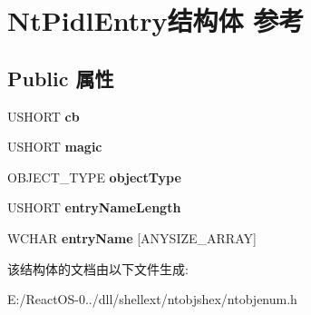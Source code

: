 \hypertarget{struct_nt_pidl_entry}{}\section{Nt\+Pidl\+Entry结构体 参考}
\label{struct_nt_pidl_entry}
\subsection*{Public 属性}
\begin{DoxyCompactItemize}
\item 
\mbox{\label{struct_nt_pidl_entry_a6de9a87db88e6b313914d3c1cb78dda2}} 
U\+S\+H\+O\+RT {\bfseries cb}
\item 
\mbox{\label{struct_nt_pidl_entry_afba69184110bbe9d52ec48a976fe9207}} 
U\+S\+H\+O\+RT {\bfseries magic}
\item 
\mbox{\label{struct_nt_pidl_entry_a07899f2618f0d1b7f2850006d47359ab}} 
O\+B\+J\+E\+C\+T\+\_\+\+T\+Y\+PE {\bfseries object\+Type}
\item 
\mbox{\label{struct_nt_pidl_entry_a8b83c31a61425286c10a73fbe686251d}} 
U\+S\+H\+O\+RT {\bfseries entry\+Name\+Length}
\item 
\mbox{\label{struct_nt_pidl_entry_a876c7f9a61a415f3e4a3262e182d2e29}} 
W\+C\+H\+AR {\bfseries entry\+Name} \mbox{[}A\+N\+Y\+S\+I\+Z\+E\+\_\+\+A\+R\+R\+AY\mbox{]}
\end{DoxyCompactItemize}


该结构体的文档由以下文件生成\+:\begin{DoxyCompactItemize}
\item 
E\+:/\+React\+O\+S-\/0../dll/shellext/ntobjshex/ntobjenum.\+h\end{DoxyCompactItemize}
